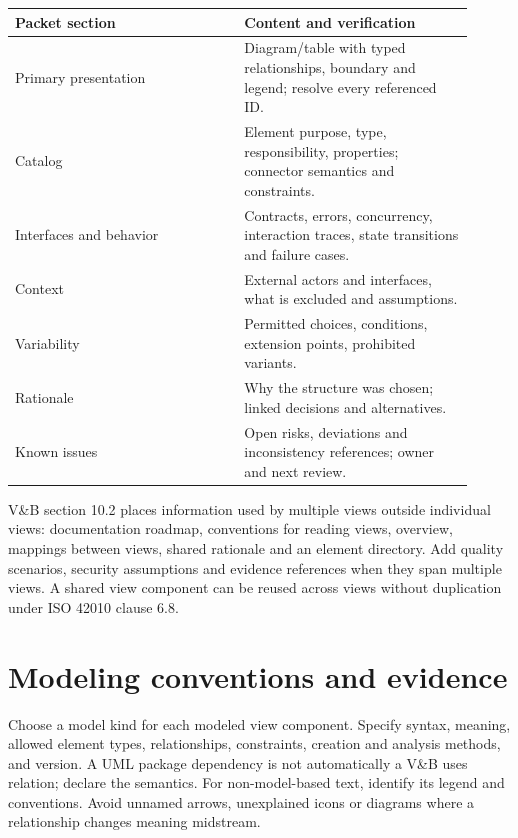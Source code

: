 \documentclass[11pt,letterpaper]{article}
\newcommand{\docsection}[1]{\Needspace{5\baselineskip}\section{#1}}
\begin{document}
\begin{longtable}{@{}>{\RaggedRight\arraybackslash}p{0.457\linewidth}>{\RaggedRight\arraybackslash}p{0.457\linewidth}@{}}
\toprule
\textbf{Packet section} & \textbf{Content and verification}\\\midrule
\endhead
Primary presentation & Diagram/table with typed relationships, boundary and legend; resolve every referenced ID.\\
Catalog & Element purpose, type, responsibility, properties; connector semantics and constraints.\\
Interfaces and behavior & Contracts, errors, concurrency, interaction traces, state transitions and failure cases.\\
Context & External actors and interfaces, what is excluded and assumptions.\\
Variability & Permitted choices, conditions, extension points, prohibited variants.\\
Rationale & Why the structure was chosen; linked decisions and alternatives.\\
Known issues & Open risks, deviations and inconsistency references; owner and next review.\\
\bottomrule
\end{longtable}
V\&B section 10.2 places information used by multiple views outside individual views: documentation roadmap, conventions for reading views, overview, mappings between views, shared rationale and an element directory. Add quality scenarios, security assumptions and evidence references when they span multiple views. A shared view component can be reused across views without duplication under ISO 42010 clause 6.8.

\docsection{Modeling conventions and evidence}
Choose a model kind for each modeled view component. Specify syntax, meaning, allowed element types, relationships, constraints, creation and analysis methods, and version. A UML package dependency is not automatically a V\&B uses relation; declare the semantics. For non-model-based text, identify its legend and conventions. Avoid unnamed arrows, unexplained icons or diagrams where a relationship changes meaning midstream.
\end{document}
